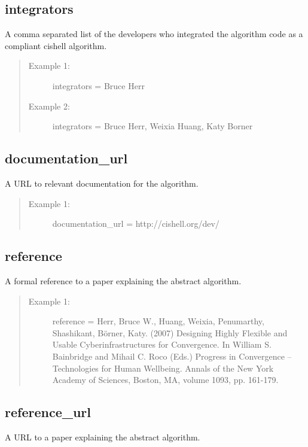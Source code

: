 \subsection*{integrators}
A comma separated list of the developers who integrated the algorithm code as
a compliant cishell algorithm.

\begin{quote}
\begin{description}
  \item[Example 1:] integrators = Bruce Herr
  \item[Example 2:] integrators = Bruce Herr, Weixia Huang, Katy Borner 
\end{description}
\end{quote}


\subsection*{documentation\_url}
A URL to relevant documentation for the algorithm.

\begin{quote}
\begin{description}
  \item[Example 1:] documentation\_url = http://cishell.org/dev/ 
\end{description}
\end{quote}


\subsection*{reference}
A formal reference to a paper explaining the abstract algorithm.

\begin{quote}
\begin{description}
  \item[Example 1:] reference = Herr, Bruce W., Huang, Weixia, Penumarthy,
  Shashikant, Börner, Katy. (2007) Designing Highly Flexible and Usable 
  Cyberinfrastructures for Convergence. In William S. Bainbridge and Mihail C. 
  Roco (Eds.) Progress in Convergence – Technologies for Human Wellbeing. 
  Annals of the New York Academy of Sciences, Boston, MA, volume 1093, pp. 161-179.
\end{description}
\end{quote}


\subsection*{reference\_url}
A URL to a paper explaining the abstract algorithm.

